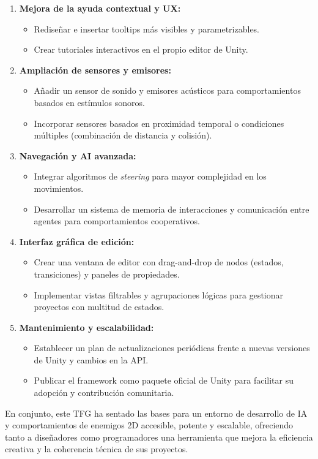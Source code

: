 \begin{enumerate}
  \item \textbf{Mejora de la ayuda contextual y UX:}  
    \begin{itemize}
      \item Rediseñar e insertar tooltips más visibles y parametrizables.  
      \item Crear tutoriales interactivos en el propio editor de Unity.  
    \end{itemize}

  \item \textbf{Ampliación de sensores y emisores:}  
    \begin{itemize}
      \item Añadir un sensor de sonido y emisores acústicos para comportamientos basados en estímulos sonoros.  
      \item Incorporar sensores basados en proximidad temporal o condiciones múltiples (combinación de distancia y colisión).  
    \end{itemize}

  \item \textbf{Navegación y AI avanzada:}  
    \begin{itemize}
      \item Integrar algoritmos de \textit{steering} para mayor complejidad en los movimientos.
      \item Desarrollar un sistema de memoria de interacciones y comunicación entre agentes para comportamientos cooperativos.  
    \end{itemize}

  \item \textbf{Interfaz gráfica de edición:}  
    \begin{itemize}
      \item Crear una ventana de editor con drag-and-drop de nodos (estados, transiciones) y paneles de propiedades.  
      \item Implementar vistas filtrables y agrupaciones lógicas para gestionar proyectos con multitud de estados.  
    \end{itemize}

  \item \textbf{Mantenimiento y escalabilidad:}  
    \begin{itemize}
      \item Establecer un plan de actualizaciones periódicas frente a nuevas versiones de Unity y cambios en la API.  
      \item Publicar el framework como paquete oficial de Unity para facilitar su adopción y contribución comunitaria.  
    \end{itemize}
\end{enumerate}

En conjunto, este TFG ha sentado las bases para un entorno de desarrollo de IA y comportamientos de enemigos 2D accesible, potente y escalable, ofreciendo tanto a diseñadores como programadores una herramienta que mejora la eficiencia creativa y la coherencia técnica de sus proyectos.  

